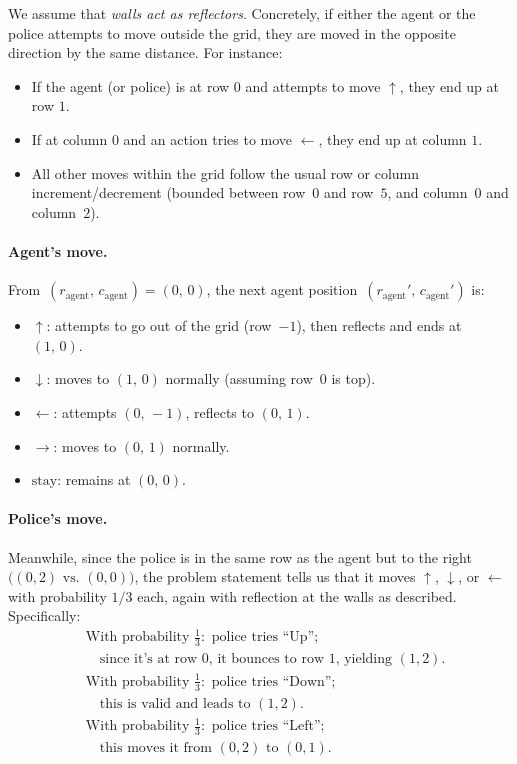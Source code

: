 \begin{enumerate}
    We assume that \emph{walls act as reflectors}.  Concretely, if either the agent or the police attempts to move outside the grid, they are moved in the opposite direction by the same distance.  For instance:
    \begin{itemize}
      \item If the agent (or police) is at row \(0\) and attempts to move \(\uparrow\), they end up at row \(1\).
      \item If at column \(0\) and an action tries to move \(\leftarrow\), they end up at column \(1\).
      \item All other moves within the grid follow the usual row or column increment/decrement (bounded between row~\(0\) and row~\(5\), and column~\(0\) and column~\(2\)).
    \end{itemize}

    \paragraph{Agent's move.}
    From \(\,(r_{\text{agent}},\,c_{\text{agent}}) = (0,\,0)\),
    the next agent position \(\,(r_{\text{agent}}',\,c_{\text{agent}}')\) is:
    \begin{itemize}
      \item \(\uparrow\):  attempts to go out of the grid (row~\(-1\)), then reflects and ends at \((1,\,0)\).
      \item \(\downarrow\): moves to \((1,\,0)\) normally (assuming row~\(0\) is top).
      \item \(\leftarrow\): attempts \((0,\,-1)\), reflects to \((0,\,1)\).
      \item \(\rightarrow\): moves to \((0,\,1)\) normally.
      \item \(\text{stay}\): remains at \((0,\,0)\).
    \end{itemize}

    \paragraph{Police's move.}
    Meanwhile, since the police is in the same row as the agent but to the right 
    \(\bigl( (0,2) \text{ vs. } (0,0) \bigr)\), the problem statement tells us that it moves 
    \(\uparrow\), \(\downarrow\), or \(\leftarrow\) with probability \(1/3\) each, again with reflection at the walls as described. Specifically:
    \[
      \begin{aligned}
        &\text{With probability } \tfrac13: \text{ police tries ``Up''}; \\[-3pt]
        &\quad \text{since it's at row~0, it bounces to row~1, yielding } (1,2).\\[3pt]
        &\text{With probability } \tfrac13: \text{ police tries ``Down''}; \\[-3pt]
        &\quad \text{this is valid and leads to }(1,2).\\[3pt]
        &\text{With probability } \tfrac13: \text{ police tries ``Left''}; \\[-3pt]
        &\quad \text{this moves it from }(0,2)\text{ to }(0,1).
      \end{aligned}
    \]


\end{enumerate}
